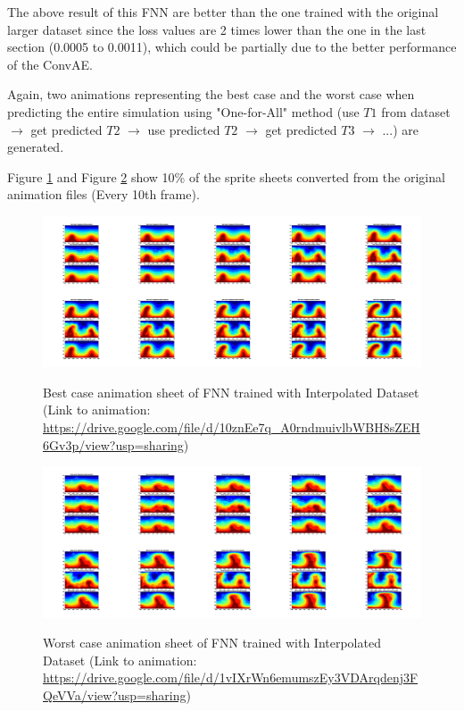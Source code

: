 The above result of this FNN are better than the one trained with the original larger dataset since the loss values are 2 times lower than the one in the last section (0.0005 to 0.0011), which could be partially due to the better performance of the ConvAE.

Again, two animations representing the best case and the worst case when predicting the entire simulation using "One-for-All" method (use $T1$ from dataset $\rightarrow$ get predicted $T2$ $\rightarrow$ use predicted $T2$ $\rightarrow$ get predicted $T3$ $\rightarrow$ ...) are generated.

Figure \ref{figure:FNN_interpolated_best_gif} and Figure \ref{figure:FNN_interpolated_worst_gif} show 10\% of the sprite sheets converted from the original animation files (Every 10th frame).

\begin{figure}[H]
    \centering
    \caption{Best case animation sheet of FNN trained with Interpolated Dataset (Link to animation: \url{https://drive.google.com/file/d/10znEe7q_A0rndmuivlbWBH8sZEH6Gv3p/view?usp=sharing})}
    \includegraphics[scale=0.10]{figures/mantle_convection_images/larger_dataset_interpolated/FNN_Best_GIF_sheet.png}
    \label{figure:FNN_interpolated_best_gif}
\end{figure}

\begin{figure}[H]
    \centering
    \caption{Worst case animation sheet of FNN trained with Interpolated Dataset (Link to animation: 
    \url{https://drive.google.com/file/d/1vIXrWn6emumszEy3VDArqdenj3FQeVVa/view?usp=sharing})}
    \includegraphics[scale=0.10]{figures/mantle_convection_images/larger_dataset_interpolated/FNN_Worst_GIF_sheet.png}
    \label{figure:FNN_interpolated_worst_gif}
\end{figure}

